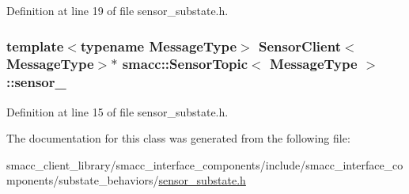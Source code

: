 Definition at line 19 of file sensor\+\_\+substate.\+h.

\subsubsection[{\texorpdfstring{sensor\+\_\+}{sensor_}}]{\setlength{\rightskip}{0pt plus 5cm}template$<$typename Message\+Type$>$ {\bf Sensor\+Client}$<$Message\+Type$>$$\ast$ {\bf smacc\+::\+Sensor\+Topic}$<$ Message\+Type $>$\+::sensor\+\_\+}\hypertarget{classsmacc_1_1SensorTopic_a0f51a83e96f6b735033a8474ef1c4191}{}\label{classsmacc_1_1SensorTopic_a0f51a83e96f6b735033a8474ef1c4191}


Definition at line 15 of file sensor\+\_\+substate.\+h.



The documentation for this class was generated from the following file\+:\begin{DoxyCompactItemize}
\item 
smacc\+\_\+client\+\_\+library/smacc\+\_\+interface\+\_\+components/include/smacc\+\_\+interface\+\_\+components/substate\+\_\+behaviors/\hyperlink{sensor__substate_8h}{sensor\+\_\+substate.\+h}\end{DoxyCompactItemize}
